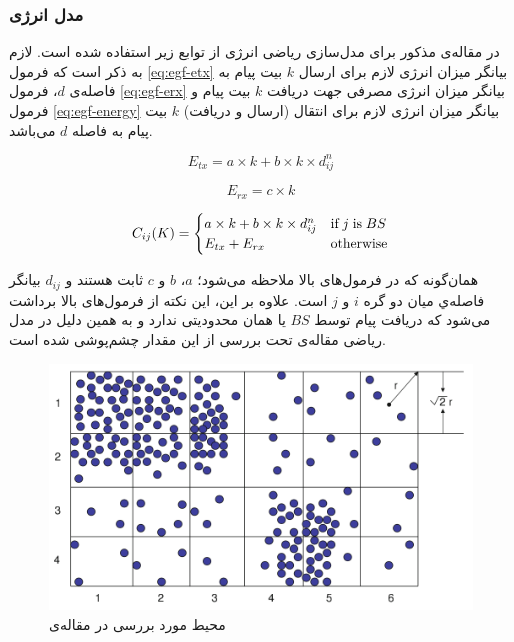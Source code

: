 \subsubsection{مدل انرژی}
در مقاله‌ی مذکور برای مدل‌سازی ریاضی انرژی از توابع زیر استفاده شده است. لازم به ذکر است که فرمول \ref{eq:egf-etx} بیانگر میزان انرژی لازم برای ارسال $k$ بیت پیام به فاصله‌ی $d$، فرمول \ref{eq:egf-erx} بیانگر میزان انرژی مصرفی جهت دریافت $k$ بیت پیام و فرمول \ref{eq:egf-energy} بیانگر میزان انرژی لازم برای انتقال (ارسال و دریافت) $k$ بیت پیام به فاصله $d$ می‌باشد.

\begin{equation}
E_{tx} = a \times k + b \times k \times d^n_{ij}
\label{eq:egf-etx}
\end{equation}

\begin{equation}
E_{rx} = c \times k
\label{eq:egf-erx}
\end{equation}

\begin{equation}
C_{ij}(K) = 
\begin{cases}
	a \times k + b \times k \times d^n_{ij} & $if$ \; j \; $is$ \; BS\\
	E_{tx} + E_{rx} & $otherwise$
\end{cases}
\label{eq:egf-energy}
\end{equation}

\par
همان‌گونه که در فرمول‌های بالا ملاحظه ‌می‌شود؛ $a$، $b$ و $c$ ثابت هستند  و $d_{ij}$ بیانگر فاصله‌ي میان دو گره $i$ و $j$ است. علاوه بر این، این نکته از فرمول‌های بالا برداشت می‌شود که دریافت پیام توسط $BS$ یا همان  محدودیتی ندارد و به همین دلیل در مدل ریاضی مقاله‌ی تحت بررسی از این مقدار چشم‌پوشی شده است.

\begin{figure}
	\centering
	\includegraphics[width=0.7\linewidth]{figs/egf-env}
	\caption {محیط مورد بررسی در مقاله‌ی \cite{}}
	\label{fig:egf-env}
\end{figure}

